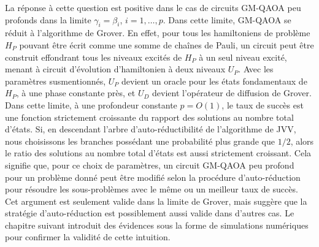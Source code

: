 La réponse à cette question est positive dans le cas de circuits GM-QAOA peu profonds dans la limite $\gamma_{i}=\beta_{i}$, $i=1,\dots,p$. Dans cette limite, GM-QAOA se réduit à l'algorithme de Grover. En effet, pour tous les hamiltoniens de problème $H_{P}$ pouvant être écrit comme une somme de chaînes de Pauli, un circuit peut être construit effondrant tous les niveaux excités de $H_{P}$ à un seul niveau excité, menant à circuit d'évolution d'hamiltonien à deux niveaux $U_{P}$. Avec les paramètres susmentionnés, $U_{P}$ devient un oracle pour les états fondamentaux de $H_{P}$, à une phase constante près, et $U_{D}$ devient l'opérateur de diffusion de Grover. Dans cette limite, à une profondeur constante $p=O(1)$, le taux de succès est une fonction strictement croissante du rapport des solutions au nombre total d'états. Si, en descendant l'arbre d'auto-réductibilité de l'algorithme de JVV, nous choisissons les branches possédant une probabilité plus grande que $1/2$, alors le ratio des solutions au nombre total d'états est aussi strictement croissant. Cela signifie que, pour ce choix de paramètres, un circuit GM-QAOA peu profond pour un problème donné peut être modifié selon la procédure d'auto-réduction pour résoudre les sous-problèmes avec le même ou un meilleur taux de succès. Cet argument est seulement valide dans la limite de Grover, mais suggère que la stratégie d'auto-réduction est possiblement aussi valide dans d'autres cas. Le chapitre suivant introduit des évidences sous la forme de simulations numériques pour confirmer la validité de cette intuition.





